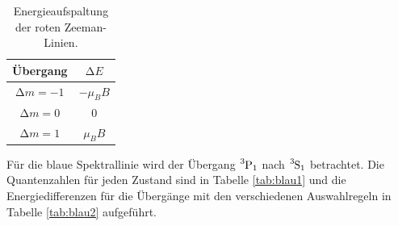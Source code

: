 \begin{table}
  \centering
  \caption{Energieaufspaltung der roten Zeeman-Linien.}
  \begin{tabular}{c c}
    \toprule
    Übergang & $\increment E$ \\
    \midrule
    $\increment m = -1$ & $-\mu_B B$ \\
    $\increment m = 0$ & 0 \\
    $\increment m = 1$ & $\mu_B B$ \\
    \bottomrule
\end{tabular}
  \label{tab:rot2}
\end{table}

Für die blaue Spektrallinie wird der Übergang $\ce{^{3}P_1}$ nach $\ce{^{3}S_1}$
betrachtet. Die Quantenzahlen für jeden Zustand sind in Tabelle \ref{tab:blau1}
und die Energiedifferenzen für die Übergänge mit den verschiedenen Auswahlregeln
in Tabelle \ref{tab:blau2} aufgeführt.


